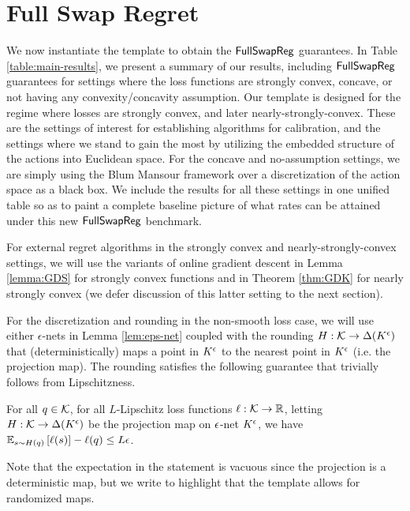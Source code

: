 \documentclass[final,12pt]{alt2025}
\begin{document}
\section{Full Swap Regret}\label{sec:main_full_swap_regret}

We now instantiate the template to obtain the $\mathsf{FullSwapReg}$ guarantees. In Table \ref{table:main-results}, we present a summary of our results, including $\mathsf{FullSwapReg}$ guarantees for settings where the loss functions are strongly convex, concave, or not having any convexity/concavity assumption.  Our template is designed for the regime where losses are strongly convex, and later nearly-strongly-convex.  These are the settings of interest for establishing algorithms for calibration, and the settings where we stand to gain the most by utilizing the embedded structure of the actions into Euclidean space.  For the concave and no-assumption settings, we are simply using the Blum Mansour framework over a discretization of the action space as a black box.  We include the results for all these settings in one unified table so as to paint a complete baseline picture of what rates can be attained under this new $\mathsf{FullSwapReg}$ benchmark.

For external regret algorithms in the strongly convex and nearly-strongly-convex settings, we will use the variants of online gradient descent in Lemma \ref{lemma:GDS} for strongly convex functions and in Theorem \ref{thm:GDK} for nearly strongly convex (we defer discussion of this latter setting to the next section).

For the discretization and rounding in the non-smooth loss case, we will use either $\epsilon$-nets in Lemma \ref{lem:eps-net} coupled with the rounding $H: \mathcal{K} \to \Delta(K^{\epsilon})$ that (deterministically) maps a point in $K^{\epsilon}$ to the nearest point in $K^{\epsilon}$ (i.e. the projection map). The rounding satisfies the following guarantee that trivially follows from Lipschitzness.

\begin{lemma}\label{lemma:NH}
    For all $q \in \mathcal{K}$, for all $L$-Lipschitz loss functions $\ell: \mathcal{K} \to \mathbb{R}$, letting $H: \mathcal{K} \to \Delta(K^{\epsilon})$ be the projection map on $\epsilon$-net $K^{\epsilon}$, we have
    $\mathbb{E}_{s \sim H(q)}\left[\ell(s)\right] - \ell(q) \leq L \epsilon$.
\end{lemma}
Note that the expectation in the statement is vacuous since the projection is a deterministic map, but we write to highlight that the template allows for randomized maps.
\end{document}
